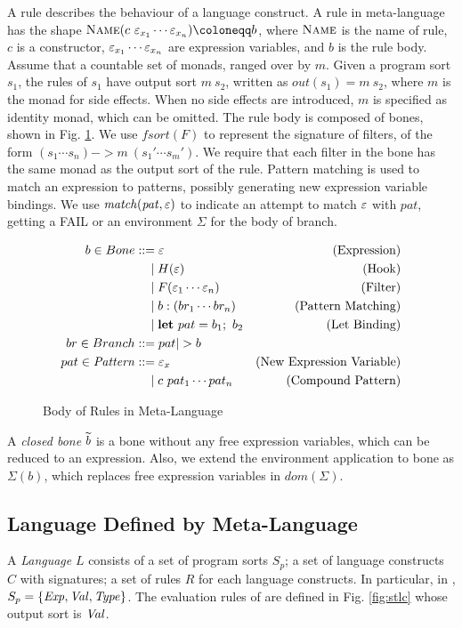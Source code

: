 A rule describes the behaviour of a language construct.
A rule in meta-language has the shape $\ctr{Name}{c~\mexp_{x_1}\cdots \mexp_{x_n}} \cqq b$, 
where $\textsc{Name}$ is the name of rule,
$c$ is a constructor, 
$\varepsilon_{x_1}\cdots \varepsilon_{x_n}$ are expression variables,
and $b$ is the rule body.
Assume that a countable set of monads, ranged over by $m$.
Given a program sort $s_1$, the rules of $s_1$ have output sort $m~s_2$,
 written as $out(s_1)=m~s_2$,
 where $m$ is the monad for side effects.
When no side effects are introduced, $m$ is specified as identity monad, which can be omitted.
The rule body is composed of bones, shown in Fig. \ref{fig:body}.
We use $\mathit{fsort}(F)$ to represent the signature of filters, of the form $(s_1\cdots s_n) -> m~(s_1'\cdots s_m')$.
We require that each filter in the bone has the same monad as the output sort of the rule.
Pattern matching is used to match an expression to patterns, possibly generating new expression variable bindings.
We use $\mathit{match(pat,\varepsilon)}$ to indicate an attempt to match $\varepsilon$ with $pat$,
 getting a FAIL or an environment $Σ$ for the body of branch.

\begin{figure}
  \begin{align*}
    b \in Bone 
      & ::= \mexp & \text{(Expression)} \\
      & \quad \mid H(\mexp) & \text{(Hook)} \\
      & \quad \mid F(\mexp_1\cdots \mexp_n) & \text{(Filter)} \\
      & \quad \mid b:(br_1\cdots br_n) & \text{(Pattern Matching)} \\
      & \quad \mid \Let{pat}{b_1} b_2 & \text{(Let Binding)} \\
    br \in Branch
      & ::= pat |> b \\
    pat \in \mathit{Pattern}
      & ::= \mexp_x & \text{(New Expression Variable)} \\
      & \quad \mid c~pat_1\cdots pat_n & \text{(Compound Pattern)}
  \end{align*}
\caption{Body of Rules in Meta-Language}
\label{fig:body}
\end{figure}

A \textit{closed bone} $\widetilde{b}$ is a bone without any free expression variables,
 which can be reduced to an expression.
Also, we extend the environment application to bone as $Σ(b)$, which replaces free expression variables in $dom(Σ)$.

\subsection{Language Defined by Meta-Language}
A \textit{Language} $L$ consists of a set of program sorts $S_p$;
 a set of language constructs $C$ with signatures;
 a set of rules $R$ for each language constructs.
In particular, in \STLC{}, $S_p=\{\mathit{Exp},\mathit{Val},\mathit{Type}\}$.
The evaluation rules of \STLC{} are defined in Fig. \ref{fig:stlc} whose output sort is $\mathit{Val}$.

